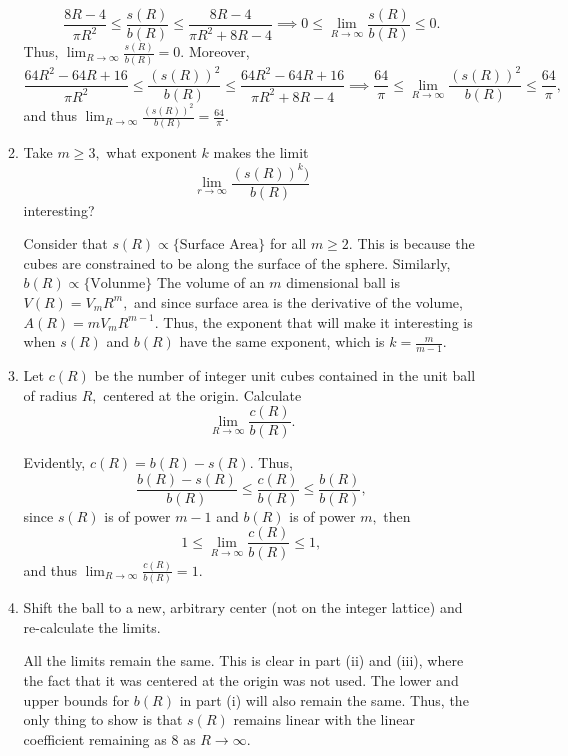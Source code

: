 \documentclass[11pt]{article}
\begin{document}
\begin{enumerate}
\begin{enumerate}
\begin{solution}
        \[\frac{8R-4}{\pi R^2}\leq \frac{s(R)}{b(R)}\leq \frac{8R-4}{\pi R^2 + 8R-4} \implies 0\leq \lim_{R\to \infty}\frac{s(R)}{b(R)} \leq 0.\] Thus, $\displaystyle \lim_{R\to\infty}\frac{s(R)}{b(R)} = 0.$ Moreover, 
        \[\frac{64R^2 - 64R + 16}{\pi R^2} \leq \frac{(s(R))^2}{b(R)} \leq \frac{64R^2 - 64R + 16}{\pi R^2 + 8R - 4} \implies \frac{64}{\pi}\leq \lim_{R\to \infty} \frac{(s(R))^2}{b(R)} \leq \frac{64}{\pi},\] and thus 
        $\displaystyle\lim_{R\to \infty}\frac{(s(R))^2}{b(R)} = \frac{64}{\pi}.$
    \end{solution}
    \item 
    \begin{problem}
        Take $m\geq 3,$ what exponent $k$ makes the limit
        \[\lim_{r\to \infty} \frac{(s(R))^k)}{b(R)}\] interesting?
    \end{problem}
    \begin{solution}
        Consider that $s(R)\propto \text{\{Surface Area\}}$ for all $m\geq 2.$ This is because the cubes are constrained to be along the surface of the sphere. Similarly, $b(R)\propto \text{\{Volunme\}}$ The volume of an $m$ dimensional ball is $V(R) = V_m R^m,$ and since surface area is the derivative of the volume, $A(R) = mV_mR^{m-1}.$ Thus, the exponent that will make it interesting is when $s(R)$ and $b(R)$ have the same exponent, which is $k = \frac{m}{m-1}.$
    \end{solution}
    \item 
    \begin{problem}
        Let $c(R)$ be the number of integer unit cubes contained in the unit ball of radius $R,$ centered at the origin. Calculate
        \[\lim_{R\to \infty}\frac{c(R)}{b(R)}.\]
    \end{problem}
    \begin{solution}
        Evidently, $c(R)= b(R) - s(R).$ Thus,
        \[\frac{b(R) - s(R)}{b(R)}\leq\frac{c(R)}{b(R)}\leq \frac{b(R)}{b(R)},\] since $s(R)$ is of power $m-1$ and $b(R)$ is of power $m,$ then
        \[1\leq \lim_{R\to \infty} \frac{c(R)}{b(R)}\leq 1,\] and thus $\displaystyle\lim_{R\to \infty} \frac{c(R)}{b(R)} = 1.$
    \end{solution}
    \item 
    \begin{problem}
        Shift the ball to a new, arbitrary center (not on the integer lattice) and re-calculate the limits.
    \end{problem}
    \begin{solution}
        All the limits remain the same. This is clear in part (ii) and (iii), where the fact that it was centered at the origin was not used. The lower and upper bounds for $b(R)$ in part (i) will also remain the same. Thus, the only thing to show is that $s(R)$ remains linear with the linear coefficient remaining as $8$ as $R\to \infty.$\\

\end{solution}
\end{enumerate}
\end{enumerate}
\end{document}
